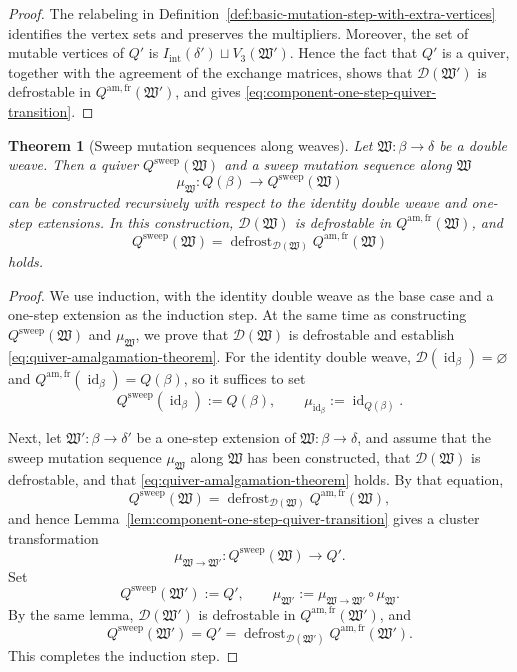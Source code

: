 \documentclass[10pt,a4paper]{article}
\newtheorem{theorem}{Theorem}[section]
\theoremstyle{definition}
\theoremstyle{remark}
\newcommand{\Dcal}{\mathcal D}
\newcommand{\fW}{\mathfrak W}
\newcommand{\id}{\operatorname{id}}
\begin{document}
\begin{proof}
The relabeling in Definition~\ref{def:basic-mutation-step-with-extra-vertices}
identifies the vertex sets and preserves the multipliers.  Moreover, the set
of mutable vertices of \(Q'\) is
\(I_{\mathrm{int}}(\delta')\sqcup V_3(\fW')\).  Hence the fact that \(Q'\) is
a quiver, together with the agreement of the exchange matrices, shows that
\(\Dcal(\fW')\) is defrostable in \(Q^{\mathrm{am,fr}}(\fW')\), and gives
\eqref{eq:component-one-step-quiver-transition}.
\end{proof}

\begin{theorem}[Sweep mutation sequences along weaves]
\label{thm:quiver}
Let \(\fW:\beta\to\delta\) be a double weave.  Then a quiver
\(Q^{\mathrm{sweep}}(\fW)\) and a sweep mutation sequence along \(\fW\)
\[
 \mu_\fW:Q(\beta)\longrightarrow Q^{\mathrm{sweep}}(\fW)
\]
can be constructed recursively with respect to the identity double weave and
one-step extensions.  In this construction, \(\Dcal(\fW)\) is defrostable in
\(Q^{\mathrm{am,fr}}(\fW)\), and
\begin{equation}
 Q^{\mathrm{sweep}}(\fW)
 =\operatorname{defrost}_{\Dcal(\fW)}
  Q^{\mathrm{am,fr}}(\fW)
 \label{eq:quiver-amalgamation-theorem}
\end{equation}
holds.
\end{theorem}

\begin{proof}
We use induction, with the identity double weave as the base case and a
one-step extension as the induction step.  At the same time as constructing
\(Q^{\mathrm{sweep}}(\fW)\) and \(\mu_\fW\), we prove that
\(\Dcal(\fW)\) is defrostable and establish
\eqref{eq:quiver-amalgamation-theorem}.  For the identity double weave,
\(\Dcal(\id_\beta)=\varnothing\) and
\(Q^{\mathrm{am,fr}}(\id_\beta)=Q(\beta)\), so it suffices to set
\[
 Q^{\mathrm{sweep}}(\id_\beta):=Q(\beta),
 \qquad
 \mu_{\id_\beta}:=\id_{Q(\beta)}.
\]

Next, let \(\fW':\beta\to\delta'\) be a one-step extension of
\(\fW:\beta\to\delta\), and assume that the sweep mutation sequence
\(\mu_\fW\) along \(\fW\) has been constructed, that \(\Dcal(\fW)\) is
defrostable, and that \eqref{eq:quiver-amalgamation-theorem} holds.
By that equation,
\[
 Q^{\mathrm{sweep}}(\fW)
 =\operatorname{defrost}_{\Dcal(\fW)}Q^{\mathrm{am,fr}}(\fW),
\]
and hence Lemma~\ref{lem:component-one-step-quiver-transition} gives a cluster
transformation
\[
 \mu_{\fW\to\fW'}:Q^{\mathrm{sweep}}(\fW)\longrightarrow Q'.
\]
Set
\begin{equation}
 Q^{\mathrm{sweep}}(\fW'):=Q',
 \qquad
 \mu_{\fW'}:=\mu_{\fW\to\fW'}\circ\mu_\fW.
 \label{eq:term-one-step-composition}
\end{equation}
By the same lemma, \(\Dcal(\fW')\) is defrostable in
\(Q^{\mathrm{am,fr}}(\fW')\), and
\[
 Q^{\mathrm{sweep}}(\fW')
 =Q'
 =\operatorname{defrost}_{\Dcal(\fW')}Q^{\mathrm{am,fr}}(\fW').
\]
This completes the induction step.
\end{proof}
\end{document}
